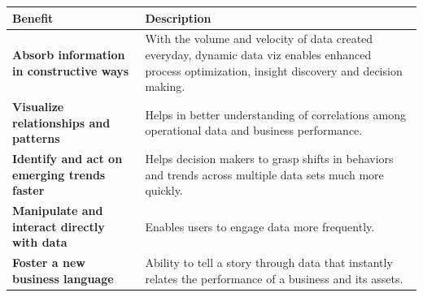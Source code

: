 \documentclass[]{book}
\theoremstyle{definition}
\theoremstyle{definition}
\theoremstyle{definition}
\theoremstyle{remark}
\begin{document}
\begin{longtable}[]{@{}ll@{}}
\toprule
\begin{minipage}[b]{0.16\columnwidth}\raggedright\strut
\textbf{Benefit}\strut
\end{minipage} & \begin{minipage}[b]{0.78\columnwidth}\raggedright\strut
\textbf{Description}\strut
\end{minipage}\tabularnewline
\midrule
\endhead
\begin{minipage}[t]{0.16\columnwidth}\raggedright\strut
\textbf{Absorb information in constructive ways}\strut
\end{minipage} & \begin{minipage}[t]{0.78\columnwidth}\raggedright\strut
With the volume and velocity of data created everyday, dynamic data viz
enables enhanced process optimization, insight discovery and decision
making.\strut
\end{minipage}\tabularnewline
\begin{minipage}[t]{0.16\columnwidth}\raggedright\strut
\textbf{Visualize relationships and patterns}\strut
\end{minipage} & \begin{minipage}[t]{0.78\columnwidth}\raggedright\strut
Helps in better understanding of correlations among operational data and
business performance.\strut
\end{minipage}\tabularnewline
\begin{minipage}[t]{0.16\columnwidth}\raggedright\strut
\textbf{Identify and act on emerging trends faster}\strut
\end{minipage} & \begin{minipage}[t]{0.78\columnwidth}\raggedright\strut
Helps decision makers to grasp shifts in behaviors and trends across
multiple data sets much more quickly.\strut
\end{minipage}\tabularnewline
\begin{minipage}[t]{0.16\columnwidth}\raggedright\strut
\textbf{Manipulate and interact directly with data}\strut
\end{minipage} & \begin{minipage}[t]{0.78\columnwidth}\raggedright\strut
Enables users to engage data more frequently.\strut
\end{minipage}\tabularnewline
\begin{minipage}[t]{0.16\columnwidth}\raggedright\strut
\textbf{Foster a new business language}\strut
\end{minipage} & \begin{minipage}[t]{0.78\columnwidth}\raggedright\strut
Ability to tell a story through data that instantly relates the
performance of a business and its assets.\strut
\end{minipage}\tabularnewline
\bottomrule
\end{longtable}
\end{document}
